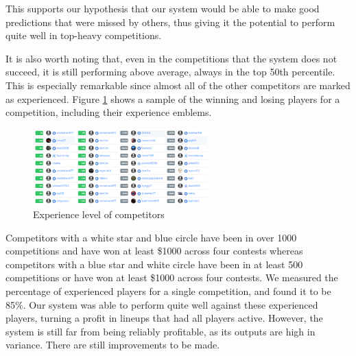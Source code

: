 This supports our hypothesis that our system would be able to make good predictions that were missed by others, thus giving it the potential to perform quite well in top-heavy competitions.

It is also worth noting that, even in the competitions that the system does not succeed, it is still performing above average, always in the top 50th percentile. This is especially remarkable since almost all of the other competitors are marked as experienced. Figure \ref{fig:competitors} shows a sample of the winning and losing players for a competition, including their experience emblems.
\begin{figure}[ht]
    \centering
    \includegraphics[width=0.6\textwidth]{figures/competitors}
    \caption{Experience level of competitors}
    \label{fig:competitors}
\end{figure}
Competitors with a white star and blue circle have been in over 1000 competitions and have won at least \$1000 across four contests whereas competitors with a blue star and white circle have been in at least 500 competitions or have won at least \$1000 across four contests. We measured the percentage of experienced players for a single competition, and found it to be 85\%. Our system was able to perform quite well against these experienced players, turning a profit in lineups that had all players active. However, the system is still far from being reliably profitable, as its outputs are high in variance. There are still improvements to be made.


